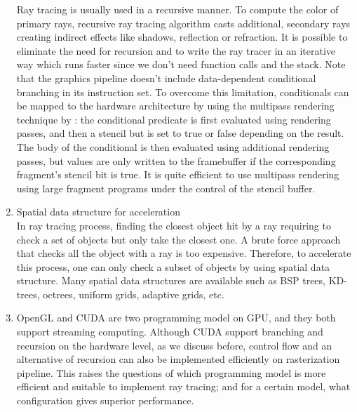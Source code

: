 \begin{enumerate}
    Ray tracing is usually used in a recursive manner. To compute the color of primary rays, recursive ray tracing algorithm casts additional, secondary rays creating indirect effects like shadows, reflection or refraction. It is possible to eliminate the need for recursion and to write the ray tracer in an iterative way which runs faster since we don't need function calls and the stack. Note that the graphics pipeline doesn't include data-dependent conditional branching in its instruction set. To overcome this limitation, conditionals can be mapped to the hardware architecture by using the multipass rendering technique by \cite{peercy2000interactive}: the conditional predicate is first evaluated using rendering passes, and then a stencil but is set to true or false depending on the result. The body of the conditional is then evaluated using additional rendering passes, but values are only written to the framebuffer if the corresponding fragment's stencil bit is true. It is quite efficient to use multipass rendering using large fragment programs under the control of the stencil buffer.
    \item Spatial data structure for acceleration\\
    In ray tracing process, finding the closest object hit by a ray requiring to check a set of objects but only take the closest one. A brute force approach that checks all the object with a ray is too expensive. Therefore, to accelerate this process, one can only check a subset of objects by using spatial data structure. Many spatial data structures are available such as BSP trees, KD-trees, octrees, uniform grids, adaptive grids, etc. 
    \item OpenGL and CUDA are two programming model on GPU, and they both support streaming computing. Although CUDA support branching and recursion on the hardware level, as we discuss before, control flow and an alternative of recursion can also be implemented efficiently on rasterization pipeline. This raises the questions of which programming model is more efficient and suitable to implement ray tracing; and for a certain model, what configuration gives superior performance.      
    
\end{enumerate}
